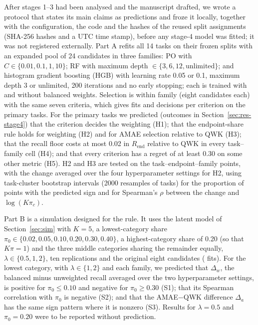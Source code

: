 \documentclass[pdflatex,sn-mathphys-ay]{sn-jnl}
\theoremstyle{thmstyleone}
\theoremstyle{thmstylethree}
\begin{document}
After stages 1--3 had been analysed and the manuscript drafted, we wrote a protocol that states its main claims as predictions and froze it locally, together with the configuration, the code and the hashes of the reused split assignments (SHA-256 hashes and a UTC time stamp), before any stage-4 model was fitted; it was not registered externally. Part A refits all 14 tasks on their frozen splits with an expanded pool of 24 candidates in three families: PO with $C\in\{0.01,0.1,1,10\}$; RF with maximum depth $\in\{3,6,12,\text{unlimited}\}$; and histogram gradient boosting (HGB) with learning rate 0.05 or 0.1, maximum depth 3 or unlimited, 200 iterations and no early stopping; each is trained with and without balanced weights. Selection is within family (eight candidates each) with the same seven criteria, which gives \FitsStageFour{} fits and \DecFour{} decisions per criterion on the primary tasks. For the primary tasks we predicted (outcomes in Section~\ref{sec:res-stage4}) that the criterion decides the weighting (H1); that the endpoint-share rule holds for weighting (H2) and for AMAE selection relative to QWK (H3); that the recall floor costs at most 0.02 in $R_{\mathrm{end}}$ relative to QWK in every task--family cell (H4); and that every criterion has a regret of at least 0.30 on some other metric (H5). H2 and H3 are tested on the \HfWPoints{} task--endpoint--family points, with the change averaged over the four hyperparameter settings for H2, using task-cluster bootstrap intervals (2000 resamples of tasks) for the proportion of points with the predicted sign and for Spearman's $\rho$ between the change and $\log(K\pi_c)$.

Part B is a simulation designed for the rule. It uses the latent model of Section~\ref{sec:sim} with $K=5$, a lowest-category share $\pi_0\in\{0.02,0.05,0.10,0.20,0.30,0.40\}$, a highest-category share of 0.20 (so that $K\pi=1$) and the three middle categories sharing the remainder equally, $\lambda\in\{0.5,1,2\}$, ten replications and the original eight candidates (\FitsSimFour{} fits). For the lowest category, with $\lambda\in\{1,2\}$ and each family, we predicted that $\Delta_w$, the balanced minus unweighted recall averaged over the two hyperparameter settings, is positive for $\pi_0\le0.10$ and negative for $\pi_0\ge0.30$ (S1); that its Spearman correlation with $\pi_0$ is negative (S2); and that the AMAE$-$QWK difference $\Delta_a$ has the same sign pattern where it is nonzero (S3). Results for $\lambda=0.5$ and $\pi_0=0.20$ were to be reported without prediction.
\end{document}
